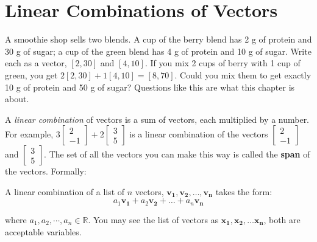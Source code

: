 \chapter{Linear Combinations of Vectors}

A smoothie shop sells two blends. A cup of the berry blend has 2 g of
protein and 30 g of sugar; a cup of the green blend has 4 g of protein and
10 g of sugar. Write each as a vector, $[2, 30]$ and $[4, 10]$. If you mix
2 cups of berry with 1 cup of green, you get
$2[2, 30] + 1[4, 10] = [8, 70]$. Could you mix them to get exactly 10 g of
protein and 50 g of sugar? Questions like this are what this chapter is
about.

A \emph{linear combination} of vectors is a sum
of vectors, each multiplied by a number. For example, $3 \begin{bmatrix}
    2 \\ -1
\end{bmatrix} + 2 \begin{bmatrix}
    3 \\ 5
\end{bmatrix}$ is 
a linear combination of the vectors $\begin{bmatrix}
    2 \\ -1
\end{bmatrix}$ and $\begin{bmatrix}
    3 \\ 5
\end{bmatrix}$. The set of all the vectors you can make this way is called
the \textbf{span} of the vectors. Formally:
\begin{mdframed}[style = important, frametitle = {Linear Combination of 
Vectors}]
A linear combination of a list of $n$ vectors, $\mathbf{v_1}, \mathbf{v_2}, \dots, \mathbf{v_n}$ takes the form:
$$a_1 \mathbf{v_1} + a_2 \mathbf{v_2} + \dots + a_n \mathbf{v_n}$$

where $a_1, a_2, \cdots, a_n \in \mathbb{R}$. You may see the list of vectors as $\mathbf{x_1}, \mathbf{x_2}, \dots \mathbf{x_n}$, both are acceptable variables.
\end{mdframed}

